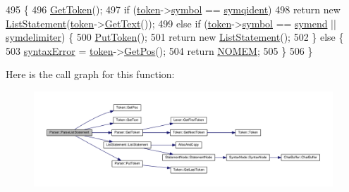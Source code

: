\begin{DoxyCode}
495 \{
496     \hyperlink{classParser_a415a103e66558b4d366d9a1420561fe3}{GetToken}();
497     \textcolor{keywordflow}{if} (\hyperlink{classParser_a467028559d31c5b33f16ca8be56715cc}{token}->\hyperlink{structToken_aa671eaaae5632c5277e89a090d864820}{symbol} == \hyperlink{lex_8h_a7feef761cd73fac6e25b8bb80d2c4e54a9a4f2a8a367485e87d9faf675bec17af}{symqident})
498         \textcolor{keywordflow}{return} \textcolor{keyword}{new} \hyperlink{classListStatement}{ListStatement}(\hyperlink{classParser_a467028559d31c5b33f16ca8be56715cc}{token}->\hyperlink{structToken_a15f1043de07ce8e452fbf115b85def71}{GetText}());
499     \textcolor{keywordflow}{else} \textcolor{keywordflow}{if} (\hyperlink{classParser_a467028559d31c5b33f16ca8be56715cc}{token}->\hyperlink{structToken_aa671eaaae5632c5277e89a090d864820}{symbol} == \hyperlink{lex_8h_a7feef761cd73fac6e25b8bb80d2c4e54a9be8426421896b360944c1313abeffdb}{symend} || \hyperlink{lex_8h_a7feef761cd73fac6e25b8bb80d2c4e54ac8e5e4f0940e69be4fca18ed8cbb236f}{symdelimiter}) \{
500         \hyperlink{classParser_adb5c3a188b36f7ecb198ae30f06338b3}{PutToken}();
501         \textcolor{keywordflow}{return} \textcolor{keyword}{new} \hyperlink{classListStatement}{ListStatement}();
502     \} \textcolor{keywordflow}{else} \{
503         \hyperlink{classParser_ae50a199b804c9f5e8342a4d0a1ae6a95}{syntaxError} = \hyperlink{classParser_a467028559d31c5b33f16ca8be56715cc}{token}->\hyperlink{structToken_a5f93ea94940a6eeb060507e1da594599}{GetPos}();
504         \textcolor{keywordflow}{return} \hyperlink{platform_8h_a46ff2bfbf0d44b8466a2251d5bd5e6f8}{NOMEM};
505     \}
506 \}
\end{DoxyCode}


Here is the call graph for this function\+:
\nopagebreak
\begin{figure}[H]
\begin{center}
\leavevmode
\includegraphics[width=350pt]{d0/d40/classParser_aa0642d13c500401b168035f9fcdbe1f4_cgraph}
\end{center}
\end{figure}




